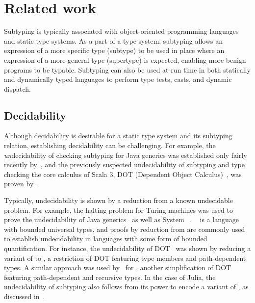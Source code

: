 \chapter{Related work}\label{chap:5}

Subtyping is typically associated with object-oriented programming languages and
static type systems. As a part of a type system, subtyping allows
an expression of a more specific type (subtype) to be used in place
where an expression of a more general type (supertype) is expected,
enabling more benign programs to be typable.
Subtyping can also be used at run time
in both statically and dynamically typed languages to perform
type tests, casts, and dynamic dispatch.

\section{Decidability}

Although decidability is desirable for a static type system and its
subtyping relation, establishing decidability can be challenging.
For example, the \emph{un}decidability of checking subtyping for Java generics
was established only fairly recently by~\citet{grigore:java-undec:2017},
and the previously suspected undecidability of subtyping and type checking 
the core calculus of Scala 3,
DOT (Dependent Object Calculus)~\cite{amin:dot:2016},
was proven by~\citet{hu:dot-undec:2020}.

Typically, undecidability is shown by a reduction from a known undecidable
problem. For example, the halting problem for Turing machines was used
to prove the undecidability of Java generics~\cite{grigore:java-undec:2017}
as well as System \FSub~\cite{pierce:bound-sub-undec:1992}.
\FSub~\cite{cardelli:fsub:1991} is a language with bounded universal types,
and proofs by reduction from \FSub are commonly used to establish
undecidability in languages with some form of bounded quantification.
For instance, the undecidability of DOT~\cite{hu:dot-undec:2020} was shown
by reducing a variant of \FSub to \DSub, a restriction of DOT featuring type
members and path-dependent types. A similar approach was used
by~\citet{mackay:path-dep-dec:2020} for \WyvCore, another simplification of
DOT featuring path-dependent and recursive types.
In the case of Julia, the undecidability of subtyping also follows from its
power to encode a variant of \FSub,
as discussed in~.

